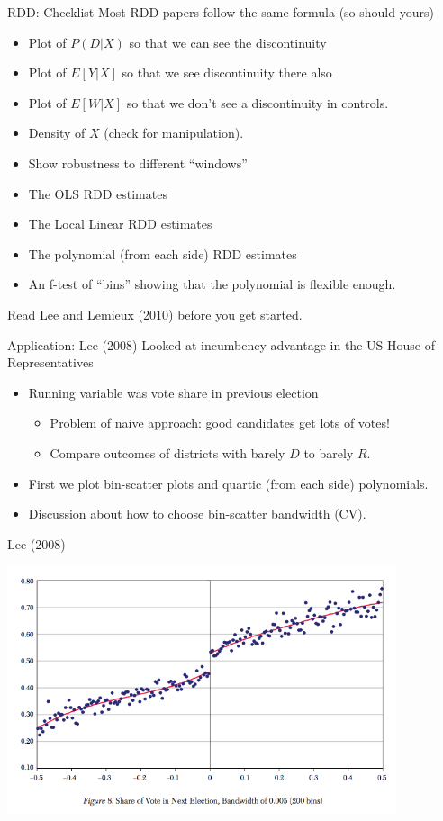 \documentclass[xcolor=pdftex,dvipsnames,table,mathserif]{beamer}
\begin{document}
	
\begin{frame}{RDD: Checklist}
Most RDD papers follow the same formula (so should yours)
\begin{itemize}
\item Plot of $P(D | X)$ so that we can see the discontinuity
\item Plot of $E[Y | X]$ so that we see discontinuity there also
\item Plot of $E[W | X ]$ so that we don't see a discontinuity in controls.
\item Density of $X$ (check for manipulation).
\item Show robustness to different ``windows''
\item The OLS RDD estimates
\item The Local Linear RDD estimates
\item The polynomial (from each side) RDD estimates
\item An f-test of ``bins'' showing that the polynomial is flexible enough.
\end{itemize}
Read Lee and Lemieux (2010) before you get started.
\end{frame}


\begin{frame}{Application: Lee (2008)}
Looked at incumbency advantage in the US House of Representatives
\begin{itemize}
\item Running variable was vote share in previous election
\begin{itemize}
\item Problem of naive approach: good candidates get lots of votes!
\item Compare outcomes of districts with barely $D$ to barely $R$.
\end{itemize}
\item First we plot bin-scatter plots and quartic (from each side) polynomials.
\item Discussion about how to choose bin-scatter bandwidth (CV).
\end{itemize}
\end{frame}

\begin{frame}{Lee (2008)}
\begin{center}
\includegraphics[width=4.5in]{./resources/binscatter1}
\end{center}
\end{frame}
\end{document}

